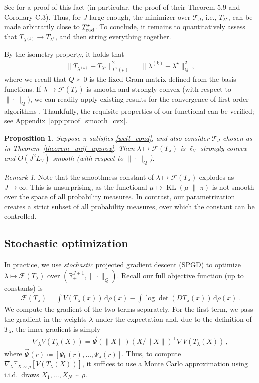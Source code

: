 \documentclass[twoside]{article}
\newcommand{\cF}{\mathcal{F}}
\newcommand{\cT}{\mathcal{T}}
\newcommand{\1}{\mathds{1}}
\newcommand{\kl}[2]{\KL(#1 \!\;\|\; \!#2)}
\newcommand{\R}{\mathbb{R}}
\newcommand*{\E}{\mathbb E}
\newcommand*{\defeq}{\coloneqq}
\newcommand*{\rd}{\mathrm{d}}
\newcommand*{\dd}{\, \rd}
\DeclareMathOperator*{\KL}{KL}
\theoremstyle{plain}
\newtheorem{prop}[theorem]{Proposition}
\theoremstyle{definition}
\theoremstyle{remark}
\newtheorem{remark}[theorem]{Remark}
\begin{document}
See \citet[Appendix C]{JiaChePoo24MFVI} for a proof of this fact (in particular, the proof of their Theorem 5.9 and Corollary C.3). Thus, for $J$ large enough, the minimizer over $\cT_J$, i.e., $T_{\lambda^\star}$, can be made arbitrarily close to $T^\star_{\rm rad}$. To conclude, it remains to quantitatively assess that $T_{\lambda^{(k)}} \to T_{\lambda^\star}$, and then string everything together.

By the isometry property, it holds that
\begin{align*}
    \| T_{\lambda^{(k)}} - T_{\lambda^\star} \|^2_{L^2(\rho)} = \|\lambda^{(k)} - \lambda^\star\|^2_{Q}\,,
\end{align*}
where we recall that $Q \succ 0$ is the fixed Gram matrix defined from the basis functions. If $\lambda \mapsto \cF(T_\lambda)$ is smooth and strongly convex (with respect to $\|\cdot\|_Q$), we can readily apply existing results for the convergence of first-order algorithms \citep[see, e.g.,][]{Beck2017}. Thankfully, the requisite properties of our functional can be verified; {see Appendix~\ref{app:proof_smooth_cvx}.}
\begin{prop}\label{prop:cf_smooth_convex}
Suppose $\pi$ satisfies \eqref{well_cond}, and also consider $\cT_J$ chosen as in Theorem~\ref{theorem_unif_approx}. Then $\lambda\mapsto \cF(T_\lambda)$ is $\ell_V$-strongly convex and ${\widetilde O(J^2 L_V)}$-smooth (with respect to $\|\cdot\|_Q$).
\end{prop}
\begin{remark}
Note that the smoothness constant of $\lambda \mapsto \cF(T_\lambda)$ explodes as $J \to \infty$. This is unsurprising, as the functional $\mu\mapsto \kl{\mu}{\pi}$ is not smooth over the space of all probability measures. {In contrast, our parametrization creates a strict subset of all probability measures, over which the constant can be controlled.} 
\end{remark}

\subsection{Stochastic optimization}\label{sec:stoc_opt}
In practice, we use \emph{stochastic} projected gradient descent (SPGD) to optimize $\lambda \mapsto \cF(T_\lambda)$ over $(\R^{J+1}_+,\|\cdot\|_Q)$. Recall our full objective function (up to constants) is
\begin{align*}
    \cF(T_\lambda)\! = \!\int V(T_\lambda(x))\dd\rho(x) \!- \!\int \log\det(DT_\lambda(x))\dd\rho(x)\,.
\end{align*}
We compute the gradient of the two terms separately. For the first term, we pass the gradient in the weights $\lambda$ under the expectation and, due to the definition of $T_\lambda$, the inner gradient is simply
\begin{align}\label{eq:nablaV_lambda}
    \nabla_\lambda V(T_\lambda(X)) = {\vec\Psi(\|X\|)(X/\|X\|)^\top}\nabla V(T_\lambda(X))\,,
\end{align}
where $\vec\Psi(r) \defeq [\Psi_0(r),\ldots,\Psi_J(r)]$.
Thus, to compute $\nabla_\lambda \E_{X\sim\rho}[V(T_\lambda(X))]$, it suffices to use a Monte Carlo approximation using i.i.d.~draws $X_1,\ldots,X_N \sim \rho$.
\end{document}
